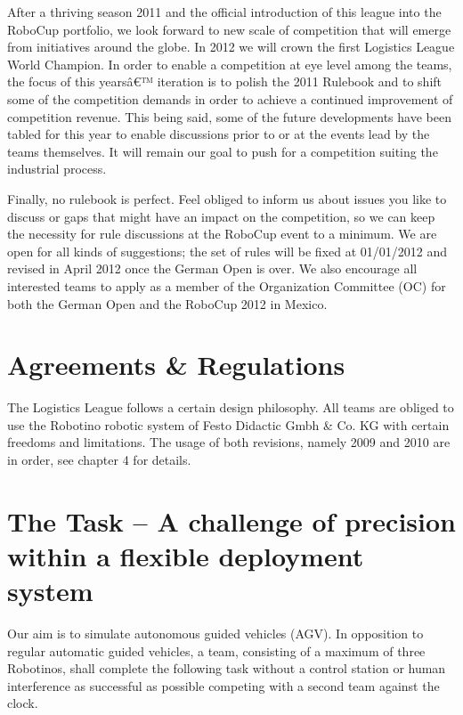 \documentclass[12pt,twoside]{article}
\begin{document}
After a thriving season 2011 and the official introduction of this
league into the RoboCup portfolio, we look forward to new scale of
competition that will emerge from initiatives around the globe. In
2012 we will crown the first Logistics League World Champion. In order
to enable a competition at eye level among the teams, the focus of
this yearsâ€™ iteration is to polish the 2011 Rulebook and to shift some
of the competition demands in order to achieve a continued improvement
of competition revenue. This being said, some of the future
developments have been tabled for this year to enable discussions
prior to or at the events lead by the teams themselves. It will remain
our goal to push for a competition suiting the industrial process.

Finally, no rulebook is perfect. Feel obliged to inform us about
issues you like to discuss or gaps that might have an impact on the
competition, so we can keep the necessity for rule discussions at the
RoboCup event to a minimum. We are open for all kinds of suggestions;
the set of rules will be fixed at 01/01/2012 and revised in April 2012
once the German Open is over. We also encourage all interested teams
to apply as a member of the Organization Committee (OC) for both the
German Open and the RoboCup 2012 in Mexico.



\section{Agreements \& Regulations}

The Logistics League follows a certain design philosophy. All teams
are obliged to use the Robotino robotic system of Festo Didactic Gmbh
\& Co. KG with certain freedoms and limitations. The usage of both
revisions, namely 2009 and 2010 are in order, see chapter 4 for
details.


\section{The Task -- A challenge of precision within a flexible
  deployment system}

Our aim is to simulate autonomous guided vehicles (AGV). In opposition
to regular automatic guided vehicles, a team, consisting of a maximum
of three Robotinos, shall complete the following task without a
control station or human interference as successful as possible
competing with a second team against the clock.
\end{document}
